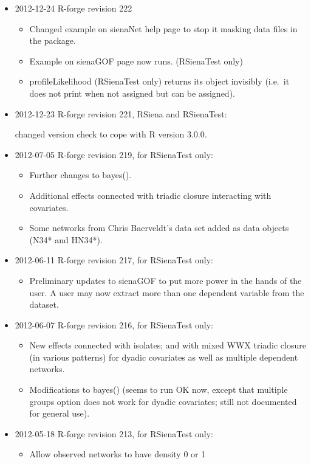 \documentclass[a4paper,fleqn,11pt]{article}
\newcommand{\+}{\, + \,}
\newcommand{\sfn}[1]{\textsf{#1}}
\begin{document}
{\begin{small}
\begin{itemize}
\item 2012-12-24 R-forge revision 222
\begin{itemize}
\item Changed example on \sfn{sienaNet} help page to stop it masking data files
  in the package.
\item Example on \sfn{sienaGOF} page now runs. (RSienaTest only)
\item \sfn{profileLikelihood} (RSienaTest only) returns its object invisibly
  (i.e.\  it does not print when not assigned but can be assigned).
\end{itemize}
\item 2012-12-23 R-forge revision 221, RSiena and RSienaTest:

  changed version check to cope with R version 3.0.0.
\item 2012-07-05 R-forge revision 219, for RSienaTest only:
\begin{itemize}
  \item Further changes to bayes().
  \item Additional effects connected with triadic closure interacting with
    covariates.
  \item Some networks from Chris Baerveldt's data set added
        as data objects (N34* and HN34*).
\end{itemize}
\item 2012-06-11 R-forge revision 217, for RSienaTest only:
\begin{itemize}
  \item Preliminary updates to sienaGOF to put more power in the hands of the
  user.
  A user may now extract more than one dependent variable from the dataset.
\end{itemize}
\item 2012-06-07 R-forge revision 216, for RSienaTest only:
\begin{itemize}
  \item New effects connected with isolates; and with mixed WWX triadic closure
      (in various patterns) for dyadic covariates as well as multiple
      dependent networks.
  \item Modifications to bayes() (seems to run OK now, except that multiple
      groups option does not work for dyadic covariates;
      still not documented for general use).
\end{itemize}
\item 2012-05-18 R-forge revision 213, for RSienaTest only:
    \begin{itemize}
     \item Allow observed networks to have density 0 or 1

\end{itemize}
\end{itemize}
\end{small}}
\end{document}
